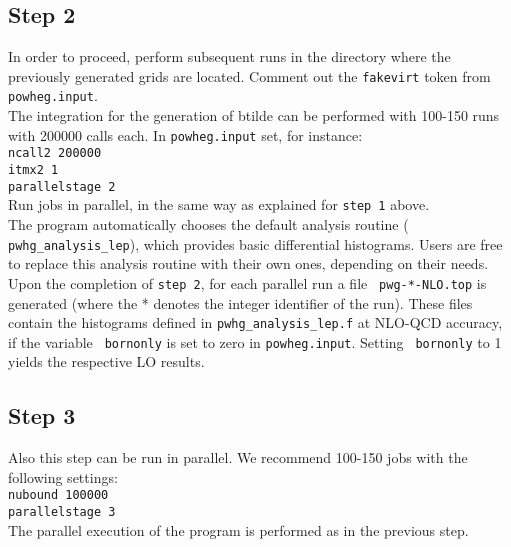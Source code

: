 \documentclass[a4paper,11pt]{article}
\begin{document}
\subsection*{Step 2}
%
In order to proceed, perform subsequent runs in the directory where the previously generated grids are located.
%
Comment out the {\tt fakevirt} token from {\tt powheg.input}. 
\\[2ex]
The integration for the generation of btilde can be
performed with 100-150 runs with 200000 calls each. In {\tt powheg.input} set, for instance:
\\[2ex]
{\tt ncall2 200000}
\\
{\tt itmx2 1}
\\
{\tt parallelstage  2}
\\[2ex]
Run jobs in parallel, in the same way as explained for {\tt step 1} above. 
\\[2ex]
The program automatically chooses the default analysis routine ({\tt
  pwhg\_analysis\_lep}), which provides basic differential histograms. Users are free to replace this analysis routine with their own ones, depending on their needs.  
\\[2ex]
Upon the completion of {\tt step 2}, for each parallel run a file {\tt
  pwg-*-NLO.top} is generated (where the * denotes the integer
identifier of the run).  These files contain the histograms defined in
{\tt pwhg\_analysis\_lep.f} at NLO-QCD accuracy, if the variable {\tt
  bornonly} is set to zero in {\tt powheg.input}.  Setting {\tt
  bornonly} to 1 yields the respective LO results.
%
\subsection*{Step 3}
%
Also this step can be run in parallel. 
We recommend 100-150 jobs with the following settings:
\\[2ex]
{\tt nubound 100000}
\\
{\tt parallelstage  3}
\\[2ex] 
The parallel execution of the program is
performed as in the previous step.

\end{document}
